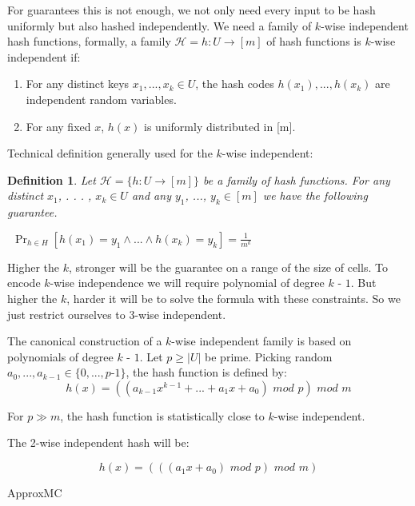 \documentclass[letterpaper]{article} %
\newtheorem{definition}{Definition}
\begin{document}
For guarantees this is not enough, we not only need every input to be hash uniformly but also hashed independently. We need a family of $k$-wise independent hash functions,
%
 formally, 
 a family $\mathcal{H} = {h : U \to [m]}$ of hash functions
 is $k$-wise independent if:
 \begin{enumerate}
 	\item For any distinct keys $x_1, ..., x_k \in U$, the hash codes
 	$h(x_1), ..., h(x_k)$ are independent random variables.
 	\item For any fixed $x$, $h(x)$ is uniformly distributed in [m].
 \end{enumerate}

Technical definition generally used for the $k$-wise independent:
 \begin{definition}
 	Let $\mathcal{H}=\{h: U \to [m]\}$ be a family of hash functions. For any distinct $x_1$, . . . , $x_k \in U$ and any $y_1$, ..., $y_k \in [m]$ we have the following guarantee.
 	
 	$~~\Pr_{h\in H}
 	[h(x_1) = y_1 \land ... \land h(x_k) = y_k] = \frac {1}
 {m^
 	k}$
 \end{definition}
 
 Higher the $k$, stronger will be the guarantee on a range of the size of cells. To encode $k$-wise independence we will require polynomial of degree $k$ - $1$. But higher the $k$, harder it will be to solve the formula with these constraints. So we just restrict ourselves to 3-wise independent.


The canonical construction of a $k$-wise independent family is based on polynomials
of degree $k$ - $1$. Let $p \geq |U|$ be prime. Picking random $a_0,...,a_{k - 1} \in \{0, . . . , p$-$ 1\}$,
the hash function is defined by:
\[ h(x) = ( ( a_{k-1} x^ {k - 1} + ... + a_1 x + a_0) \,\, mod \,\, p) \,\, mod \,\,  m\]


For $p \gg	 m$, the hash function is statistically close to $k$-wise independent.

The 2-wise independent hash will be: 

\[ h(x) = (((a_1 x + a_0) \,\, mod \,\, p) \,\, mod \,\, m ) \]


ApproxMC~\cite{DBLP:conf/cp/ChakrabortyMV13}




\end{document}
